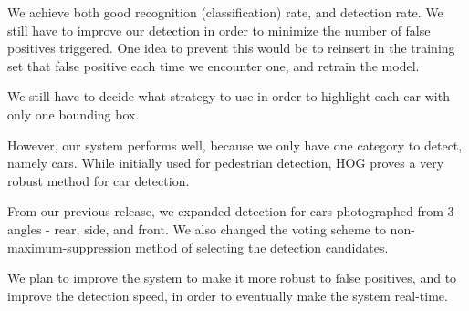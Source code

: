 We achieve both good recognition (classification) rate, and detection rate. We still have to improve our detection in order to minimize the number of false positives triggered. One idea to prevent this would be to reinsert in the training set that false positive each time we encounter one, and retrain the model.

We still have to decide what strategy to use in order to highlight each car with only one bounding box.

However, our system performs well, because we only have one category to detect, namely cars. While initially used for pedestrian detection, HOG proves a very robust method for car detection.

From our previous release, we expanded detection for cars photographed from 3 angles - rear, side, and front. We also changed the voting scheme to non-maximum-suppression method of selecting the detection candidates. 

We plan to improve the system to make it more robust to false positives, and to improve the detection speed, in order to eventually make the system real-time.

